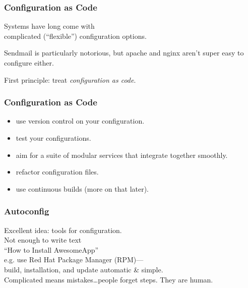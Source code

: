 \begin{frame}
\frametitle{Configuration as Code}

\large
\begin{changemargin}{2cm}
Systems have long come with \\
complicated (``flexible'') configuration options.


Sendmail is particularly notorious, but apache and nginx aren't super
easy to configure either.

First principle: treat \emph{configuration as code}.
\end{changemargin}

\end{frame}



\begin{frame}
\frametitle{Configuration as Code}

\large
\begin{changemargin}{2cm}
\begin{itemize}
\item use version control on your configuration.
\item test your configurations.
\item aim for a suite of modular services that integrate together smoothly.
\item refactor configuration files.
\item use continuous builds (more on that later).
\end{itemize}
\end{changemargin}

\end{frame}



\begin{frame}
\frametitle{Autoconfig}

\large
\begin{changemargin}{2cm}
Excellent idea: tools for configuration. \\[1em]

Not enough to write text \\
\qquad ``How to Install AwesomeApp'' \\[1em]

e.g. use Red Hat Package Manager (RPM)---\\
build, installation, and update automatic \& simple.\\[1em]

 Complicated means mistakes\ldots people forget steps. They are human. 
 \end{changemargin}
 
\end{frame}


